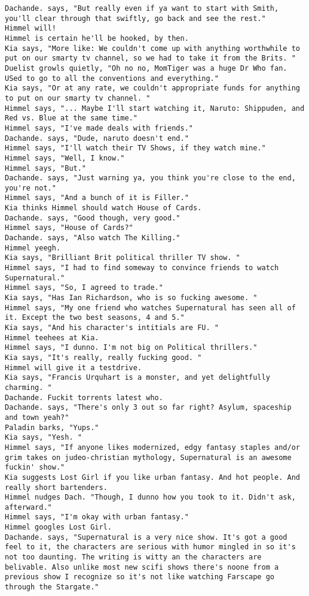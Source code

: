 \begin{verbatim}
Dachande. says, "But really even if ya want to start with Smith, you'll clear through that swiftly, go back and see the rest."
Himmel will!
Himmel is certain he'll be hooked, by then.
Kia says, "More like: We couldn't come up with anything worthwhile to put on our smarty tv channel, so we had to take it from the Brits. "
Duelist growls quietly, "Oh no no, MomTiger was a huge Dr Who fan. USed to go to all the conventions and everything."
Kia says, "Or at any rate, we couldn't appropriate funds for anything to put on our smarty tv channel. "
Himmel says, "... Maybe I'll start watching it, Naruto: Shippuden, and Red vs. Blue at the same time."
Himmel says, "I've made deals with friends."
Dachande. says, "Dude, naruto doesn't end."
Himmel says, "I'll watch their TV Shows, if they watch mine."
Himmel says, "Well, I know."
Himmel says, "But."
Dachande. says, "Just warning ya, you think you're close to the end, you're not."
Himmel says, "And a bunch of it is Filler."
Kia thinks Himmel should watch House of Cards.
Dachande. says, "Good though, very good."
Himmel says, "House of Cards?"
Dachande. says, "Also watch The Killing."
Himmel yeegh.
Kia says, "Brilliant Brit political thriller TV show. "
Himmel says, "I had to find someway to convince friends to watch Supernatural."
Himmel says, "So, I agreed to trade."
Kia says, "Has Ian Richardson, who is so fucking awesome. "
Himmel says, "My one friend who watches Supernatural has seen all of it. Except the two best seasons, 4 and 5."
Kia says, "And his character's intitials are FU. "
Himmel teehees at Kia.
Himmel says, "I dunno. I'm not big on Political thrillers."
Kia says, "It's really, really fucking good. "
Himmel will give it a testdrive.
Kia says, "Francis Urquhart is a monster, and yet delightfully charming. "
Dachande. Fuckit torrents latest who.
Dachande. says, "There's only 3 out so far right? Asylum, spaceship and town yeah?"
Paladin barks, "Yups."
Kia says, "Yesh. "
Himmel says, "If anyone likes modernized, edgy fantasy staples and/or grim takes on judeo-christian mythology, Supernatural is an awesome fuckin' show."
Kia suggests Lost Girl if you like urban fantasy. And hot people. And really short bartenders.
Himmel nudges Dach. "Though, I dunno how you took to it. Didn't ask, afterward."
Himmel says, "I'm okay with urban fantasy."
Himmel googles Lost Girl.
Dachande. says, "Supernatural is a very nice show. It's got a good feel to it, the characters are serious with humor mingled in so it's not too daunting. The writing is witty an the characters are belivable. Also unlike most new scifi shows there's noone from a previous show I recognize so it's not like watching Farscape go through the Stargate."

\end{verbatim}
